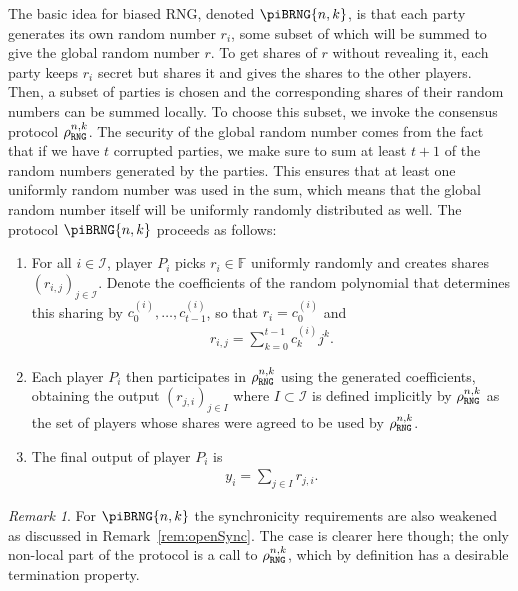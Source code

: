 \documentclass{article}
\theoremstyle{remark}
\newtheorem{remark}{Remark}
\newcommand{\F}{\mathbb{F}}
\begin{document}
The basic idea for biased RNG, denoted $\piBRNG{n,k}$, is that each party
generates its own random number $r_i$, some subset of which will be summed to
give the global random number $r$. To get shares of $r$ without revealing it,
each party keeps $r_i$ secret but shares it and gives the shares to the other
players. Then, a subset of parties is chosen and the corresponding shares of
their random numbers can be summed locally. To choose this subset, we invoke
the consensus protocol $\rho_\texttt{RNG}^{n, k}$. The security of the global random
number comes from the fact that if we have $t$ corrupted parties, we make sure
to sum at least $t + 1$ of the random numbers generated by the parties. This
ensures that at least one uniformly random number was used in the sum, which
means that the global random number itself will be uniformly randomly
distributed as well. The protocol $\piBRNG{n,k}$ proceeds as follows:

\begin{enumerate}
	\item For all $i \in \mathcal{I}$, player $P_i$ picks $r_i \in \F$
		uniformly randomly and creates shares ${(r_{i,j})}_{j \in
		\mathcal{I}}$.  Denote the coefficients of the random polynomial that
		determines this sharing by $c_0^{(i)}, \ldots, c_{t-1}^{(i)}$, so that
		$r_i = c_0^{(i)}$ and
		\begin{align*}
			r_{i, j} = \sum_{k=0}^{t-1} c_k^{(i)} j^k.
		\end{align*}

	\item Each player $P_i$ then participates in $\rho_\texttt{RNG}^{n, k}$ using the
		generated coefficients, obtaining the output ${(r_{j, i})}_{j \in
		I}$ where $I \subset \mathcal{I}$ is defined implicitly by
		$\rho_\texttt{RNG}^{n, k}$ as the set of players whose shares were agreed to be
		used by $\rho_\texttt{RNG}^{n, k}$.

	\item The final output of player $P_i$ is
		\begin{align*}
			y_i = \sum_{j \in I} r_{j, i}.
		\end{align*}
\end{enumerate}

\begin{remark}
	For $\piBRNG{n,k}$ the synchronicity requirements are also weakened as
	discussed in Remark~\ref{rem:openSync}. The case is clearer here though;
	the only non-local part of the protocol is a call to $\rho_\texttt{RNG}^{n, k}$,
	which by definition has a desirable termination property.
\end{remark}
\end{document}
